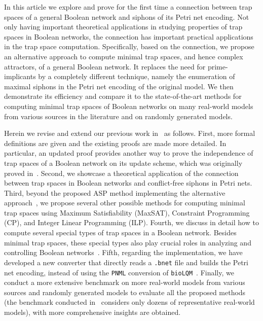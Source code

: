 \documentclass[preprint,12pt]{elsarticle}
\begin{document}
In this article we explore and prove for the first time a connection between trap spaces of a general Boolean network and siphons of its Petri net encoding.
Not only having important theoretical applications in studying properties of trap spaces in Boolean networks, the connection has important practical applications in the trap space computation.
Specifically, based on the connection, we propose an alternative approach to compute minimal trap spaces, and hence complex attractors, of a general Boolean network.
It replaces the need for prime-implicants by a completely different technique, namely the enumeration of maximal siphons in the Petri net encoding of the original model.
We then demonstrate its efficiency and compare it to the state-of-the-art methods for computing minimal trap spaces of Boolean networks on many real-world models from various sources in the literature and on randomly generated models.



Herein we revise and extend our previous work in~\cite{DBLP:conf/cmsb/TrinhBHS22} as follows.
First, more formal definitions are given and the existing proofs are made more detailed.
In particular, an updated proof provides another way to prove the independence of trap spaces of a Boolean network on its update scheme, which was originally proved in~\cite{klarner2015computing}.
Second, we showcase a theoretical application of the connection between trap spaces in Boolean networks and conflict-free siphons in Petri nets.
Third, beyond the proposed ASP method implementing the alternative approach~\cite{DBLP:conf/cmsb/TrinhBHS22}, we propose several other possible methods for computing minimal trap spaces using Maximum Satisfiability (MaxSAT), Constraint Programming (CP), and Integer Linear Programming (ILP).
Fourth, we discuss in detail how to compute several special types of trap spaces in a Boolean network.
Besides minimal trap spaces, these special types also play crucial roles in analyzing and controlling Boolean networks~\cite{Rozum2021}.
Fifth, regarding the implementation, we have developed a new converter that directly reads a \texttt{.bnet} file and builds the Petri net encoding, instead of using the \texttt{PNML} conversion of \texttt{bioLQM}~\cite{DBLP:conf/cmsb/TrinhBHS22}.
Finally, we conduct a more extensive benchmark on more real-world models from various sources and randomly generated models to evaluate all the proposed methods (the benchmark conducted in~\cite{DBLP:conf/cmsb/TrinhBHS22} considers only dozens of representative real-world models), with more comprehensive insights are obtained.
\end{document}
